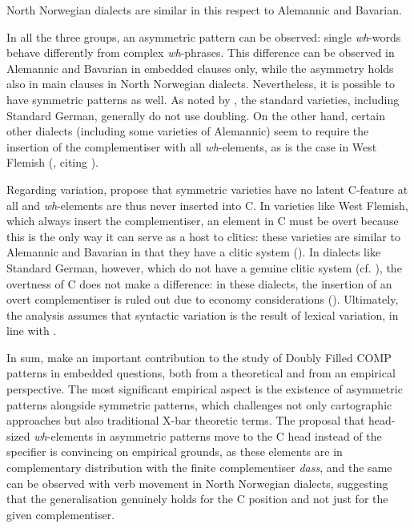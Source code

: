 North Norwegian dialects are similar in this respect to Alemannic and Bavarian. 

In all the three groups, an asymmetric pattern can be observed: single \textit{wh}-words behave differently from complex \textit{wh}-phrases. This difference can be observed in Alemannic and Bavarian in embedded clauses only, while the asymmetry holds also in main clauses in North Norwegian dialects. Nevertheless, it is possible to have symmetric patterns as well. As noted by \citet[94]{bayerbrandner2008}, the standard varieties, including Standard German, generally do not use doubling. On the other hand, certain other dialects (including some varieties of Alemannic) seem to require the insertion of the complementiser with all \textit{wh}-elements, as is the case in West Flemish (\citealt[94]{bayerbrandner2008}, citing \citealt{haegeman1992}).

Regarding variation, \citet[94]{bayerbrandner2008} propose that symmetric varieties have no latent C-feature at all and \textit{wh}-elements are thus never inserted into C. In varieties like West Flemish, which always insert the complementiser, an element in C must be overt because this is the only way it can serve as a host to clitics: these varieties are similar to Alemannic and Bavarian in that they have a clitic system (\citealt[94]{bayerbrandner2008}). In dialects like Standard German, however, which do not have a genuine clitic system (cf. \citealt{cardinaletti1999}), the overtness of C does not make a difference: in these dialects, the insertion of an overt complementiser is ruled out due to economy considerations (\citealt[94]{bayerbrandner2008}). Ultimately, the analysis assumes that syntactic variation is the result of lexical variation, in line with \citet{borer1984}.

In sum, \citet{bayerbrandner2008} make an important contribution to the study of Doubly Filled COMP patterns in embedded questions, both from a theoretical and from an empirical perspective. The most significant empirical aspect is the existence of asymmetric patterns alongside symmetric patterns, which challenges not only cartographic approaches but also traditional X-bar theoretic terms. The proposal that head-sized \textit{wh}-elements in asymmetric patterns move to the C head instead of the specifier is convincing on empirical grounds, as these elements are in complementary distribution with the finite complementiser \textit{dass}, and the same can be observed with verb movement in North Norwegian dialects, suggesting that the generalisation genuinely holds for the C position and not just for the given complementiser.\largerpage

